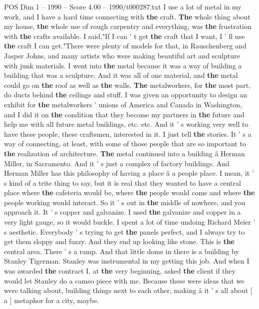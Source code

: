 \begin{textsample}{POS Dim 1 – 1990 – Score 4.00 – 1990/t000287.txt}
I use a lot of metal in my work, and I have a hard time connecting with \textbf{the} craft. \textbf{The} whole thing about my house, \textbf{the} whole use of rough carpentry and everything, was \textbf{the} frustration with \textbf{the} crafts available.
I said,"If I can ' t get \textbf{the} craft that I want, I ' ll use \textbf{the} craft I can get."There were plenty of models for that, in Rauschenberg and Jasper Johns, and many artists who were making beautiful art and sculpture with junk materials.
I went into \textbf{the} metal because it was a way of building a building that was a sculpture.
And it was all of one material, and \textbf{the} metal could go on \textbf{the} roof as well as \textbf{the} walls. \textbf{The} metalworkers, for \textbf{the} most part, do ducts behind \textbf{the} ceilings and stuff.
I was given an opportunity to design an exhibit for \textbf{the} metalworkers ' unions of America and Canada in Washington, and I did it on \textbf{the} condition that they become my partners in \textbf{the} future and help me with all future metal buildings, etc. etc.
And it ' s working very well to have these people, these craftsmen, interested in it.
I just tell \textbf{the} stories.
It ' s a way of connecting, at least, with some of those people that are so important to \textbf{the} realization of architecture. \textbf{The} metal continued into a building â Herman Miller, in Sacramento.
And it ' s just a complex of factory buildings.
And Herman Miller has this philosophy of having a place â a people place.
I mean, it ' s kind of a trite thing to say, but it is real that they wanted to have a central place where \textbf{the} cafeteria would be, where \textbf{the} people would come and where \textbf{the} people working would interact.
So it ' s out in \textbf{the} middle of nowhere, and you approach it.
It ' s copper and galvanize.
I used \textbf{the} galvanize and copper in a very light gauge, so it would buckle.
I spent a lot of time undoing Richard Meier ' s aesthetic.
Everybody ' s trying to get \textbf{the} panels perfect, and I always try to get them sloppy and fuzzy.
And they end up looking like stone.
This is \textbf{the} central area.
There ' s a ramp.
And that little dome in there is a building by Stanley Tigerman.
Stanley was instrumental in my getting this job.
And when I was awarded \textbf{the} contract I, at \textbf{the} very beginning, asked \textbf{the} client if they would let Stanley do a cameo piece with me.
Because these were ideas that we were talking about, building things next to each other, making â it ' s all about [ a ] metaphor for a city, maybe.

\end{textsample}
